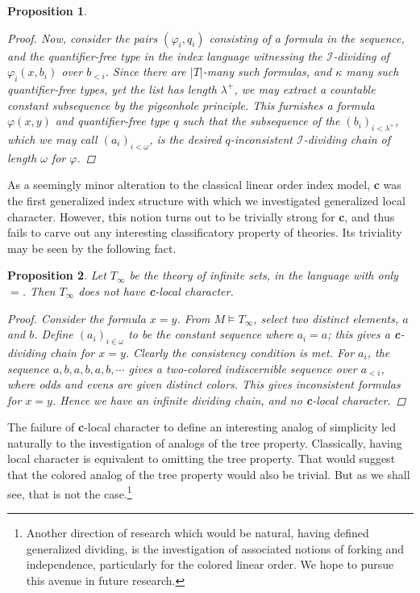\documentclass{article}
\newcommand{\calI}{\mathcal{I}}
\newcommand{\vphi}{\varphi}
\newtheorem{proposition}{Proposition}
\theoremstyle{definition}
\theoremstyle{definition}
\theoremstyle{definition}
\theoremstyle{definition}
\begin{document}
\begin{proposition}{}
\begin{proof}
Now, consider the pairs $(\vphi_i,q_i)$ consisting of a formula in the sequence, and the quantifier-free type in the index language witnessing the $\calI$-dividing of $\vphi_i(x,b_i)$ over $b_{<i}$. Since there are $|T|$-many such formulas, and $\kappa$ many such quantifier-free types, yet the list has length $\lambda^+$, we may extract a countable constant subsequence by the pigeonhole principle. This furnishes a formula $\vphi(x,y)$ and quantifier-free type $q$ such that the subsequence of the $(b_i)_{i<\lambda^+}$, which we may call $(a_i)_{i<\omega}$, is the desired $q$-inconsistent $\calI$-dividing chain of length $\omega$ for $\vphi$.
\end{proof}
\end{proposition}

As a seemingly minor alteration to the classical linear order index model, \textbf{c} was the first generalized index structure with which we investigated generalized local character. However, this notion turns out to be trivially strong for \textbf{c}, and thus fails to carve out any interesting classificatory property of theories. Its triviality may be seen by the following fact.

\begin{proposition}\label{triviality}
    Let $T_\infty$ be the theory of infinite sets, in the language with only $=$. Then $T_\infty$  does not have \textbf{c}-local character.

    \begin{proof}
        Consider the formula $x=y$. From $M\models T_\infty$, select two distinct elements, $a$ and $b$. Define $(a_i)_{i\in\omega}$ to be the constant sequence where $a_i=a$; this gives a \textbf{c}-dividing chain for $x=y$. Clearly the consistency condition is met. For $a_i$, the sequence $a,b,a,b,a,b,\dotsm$ gives a two-colored indiscernible sequence over $a_{<i}$, where odds and evens are given distinct colors. This gives inconsistent formulas for $x=y$. Hence we have an infinite dividing chain, and no \textbf{c}-local character.
    \end{proof}
\end{proposition}

The failure of \textbf{c}-local character to define an interesting analog of simplicity led naturally to the investigation of analogs of the tree property. Classically, having local character is equivalent to omitting the tree property. That would suggest that the colored analog of the tree property would also be trivial. But as we shall see, that is not the case.\footnote{Another direction of research which would be natural, having defined generalized dividing, is the investigation of associated notions of forking and independence, particularly for the colored linear order. We hope to pursue this avenue in future research.}
\end{document}
